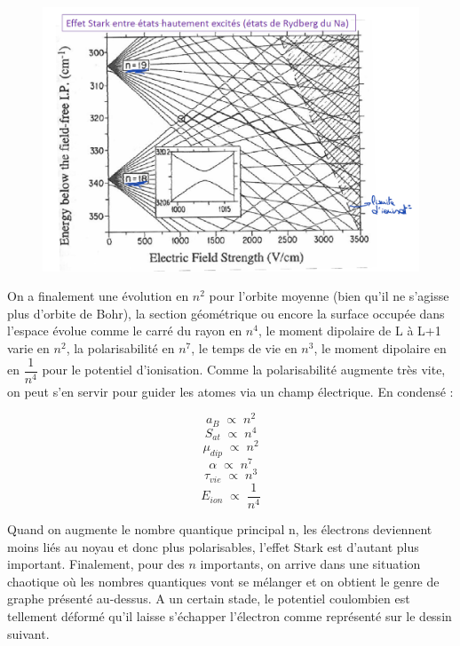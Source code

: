 \begin{figure}[tph]
    \centering
    \includegraphics[scale=0.7]{Images2/GrapheStark.PNG}
\end{figure}

On a finalement une évolution en $n^2$ pour l'orbite moyenne (bien qu'il ne s'agisse plus d'orbite de Bohr), la section géométrique ou encore la surface occupée dans l'espace évolue comme le carré du rayon en $n^4$, le moment dipolaire de L à L+1 varie en $n^2$, la polarisabilité en $n^7$, le temps de vie en $n^3$, le moment dipolaire en en $\dfrac{1}{n^4}$ pour le potentiel d'ionisation. Comme la polarisabilité augmente très vite, on peut s'en servir pour guider les atomes via un champ électrique. En condensé :

\[
    a_B \; \propto\; n^2
\]
\[
    S_{at} \; \propto\; n^4
\]
\[
    \mu_{dip} \; \propto\; n^2
\]
\[
    \alpha \; \propto\; n^7
\]
\[
    \tau_{vie} \; \propto\; n^3
\]
\[
    E_{ion} \; \propto\; \dfrac{1}{n^4}
\]

Quand on augmente le nombre quantique principal n, les électrons deviennent moins liés au noyau et donc plus polarisables, l'effet Stark est d'autant plus important. Finalement, pour des $n$ importants, on arrive dans une situation chaotique où les nombres quantiques vont se mélanger et on obtient le genre de graphe présenté au-dessus. A un certain stade, le potentiel coulombien est tellement déformé qu'il laisse s'échapper l'électron comme représenté sur le dessin suivant.\\

